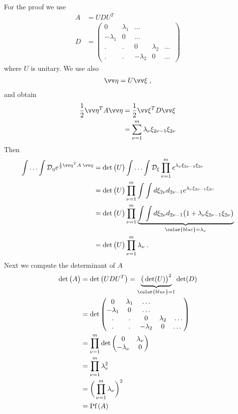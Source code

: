 For the proof we use
%
\begin{align*}
A &= U D U^{T}\\
D &=
\begin{pmatrix}
	0&\lambda_{1}&\ldots\\
	-\lambda_{1}&0&\ldots\\
	.&.&	0&\lambda_{2}&\ldots\\
	.&.&	-\lambda_{2}&0&\ldots\
\end{pmatrix}
\end{align*}
%
where $U$ is unitary. We use also
%
\begin{align}\label{eq:eta:xi}
\vv \eta = U \vv \xi\;,
\end{align}
%
and obtain
%
\begin{align*}
\frac{1}{2} \vv\eta^{T} A \vv \eta 
&= \frac{1}{2}\vv \xi^{T} D  \vv \xi\\
&= \sum_{\nu=1}^{m}  \lambda_{\nu} \xi_{2\nu-1}\xi_{2\nu}
\end{align*}
%
Then 
%
\begin{align*}
\int\ldots\int \Deta  e^{\frac{1}{2}\vv\eta^{T} A \;\vv \eta} 
&=\det\big( U \big) \int\ldots\int \Dxi   \prod_{\nu=1}^{m}
e^{\lambda_{\nu} \xi_{2\nu-1}\xi_{2\nu}} \\
&= \det\big( U \big)\prod_{\nu=1}^{m}  \int\int d \xi_{2\nu} d_{2\nu-1}
e^{\lambda_{\nu} \xi_{2\nu-1}\xi_{2\nu}} \\
&= \det\big( U \big)\prod_{\nu=1}^{m}  \underbrace{
\int\int d \xi_{2\nu} d_{2\nu-1}
\big(1+\lambda_{\nu} \xi_{2\nu-1}\xi_{2\nu}\big)
}_{\color{blue} = \lambda_{\nu}} \\
&= \det\big( U \big)\prod_{\nu=1}^{m} \lambda_{\nu} \;.
\end{align*}
%
Next we compute the determinant of $A$
%
\begin{align*}
\det\big( A \big) &=\det\big( U D U^{T} \big) =
\underbrace{
\big(\det(U)\big)^{2}
}_{\color{blue} = 1} \det(D)\\
&=
\det
\begin{pmatrix}
	0&\lambda_{1}&\ldots\\
	-\lambda_{1}&0&\ldots\\
	.&.&	0&\lambda_{2}&\ldots\\
	.&.&	-\lambda_{2}&0&\ldots\
\end{pmatrix}\\
&=
\prod_{\nu=1}^{m}
\det
\begin{pmatrix}
	0&\lambda_{\nu}\\
	-\lambda_{\nu}&0
\end{pmatrix}\\
&=\prod_{\nu=1}^{m} \lambda_{\nu}^{2}\\
&=\bigg(\prod_{\nu=1}^{m} \lambda_{\nu}\bigg)^{2}\\
&=\Pf{A}
\end{align*}
%


